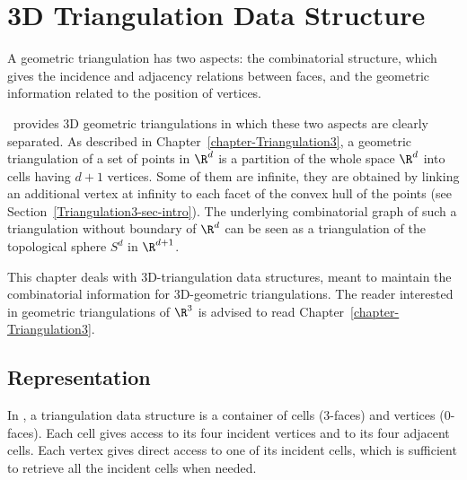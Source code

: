 \chapter{3D Triangulation Data Structure}
\label{chapter-TDS3}

\minitoc

A geometric triangulation has two aspects: the combinatorial structure, which
gives the incidence and adjacency relations between faces, and the
geometric information related to the position of vertices.

\cgal\ provides 3D geometric triangulations in which these
two aspects are clearly separated.
As described in Chapter~\ref{chapter-Triangulation3}, a geometric
triangulation of a set of points in $\R^d$ is a partition of the
whole space $\R^d$ into cells having $d+1$ vertices. Some of them
are infinite, they are obtained by linking an additional vertex at
infinity to each facet of the convex hull of the points (see
Section~\ref{Triangulation3-sec-intro}).  
The underlying combinatorial graph of such a triangulation
without boundary of $\R^d$ can be seen as a triangulation of the
topological sphere $S^d$ in $\R^{d+1}$. 

This chapter deals with 3D-triangulation data structures, meant to
maintain the combinatorial information for 3D-geometric
triangulations. The reader interested in geometric triangulations of
$\R^3$ is advised to read Chapter~\ref{chapter-Triangulation3}.

\section{Representation}
\label{TDS3-sec-intro}

In \cgal, a triangulation data structure is a
container of cells ($3$-faces) and vertices ($0$-faces). Each cell gives
access to its four incident vertices and to its four adjacent
cells. Each vertex gives direct access to one of its incident cells, which is 
sufficient to retrieve all the incident cells when needed.

